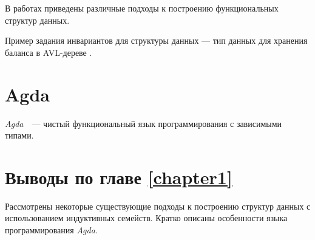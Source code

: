В работах \cite{OkasakiThesis, McBridePivotal} приведены различные подходы
к построению функциональных структур данных.

Пример задания инвариантов для
структуры данных — тип данных для хранения баланса в AVL-дереве \cite{AVLTree}.
\newline


\section{Agda}
\textit{Agda}~\cite{AgdaLang}~---  чистый функциональный язык программирования с зависимыми типами.


\section{Выводы по главе \ref{chapter1}}
Рассмотрены некоторые существующие подходы к построению структур данных
с использованием индуктивных семейств.
Кратко описаны особенности языка программирования \textit{Agda}.
